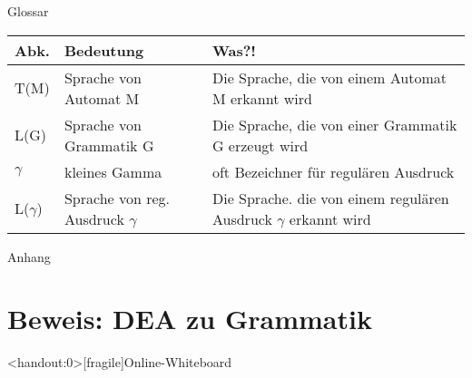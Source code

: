 \begin{frame}[fragile]{Glossar}
  \small
  \begin{tabular}{p{} p{} p{}}
    \toprule
    Abk.        & Bedeutung                          & Was?!                                                               \\
    \midrule
    T(M)        & Sprache von Automat M              & Die Sprache, die von einem Automat M erkannt wird                   \\
    L(G)        & Sprache von Grammatik G            & Die Sprache, die von einer Grammatik G erzeugt wird                 \\
    $\gamma$    & kleines Gamma                      & oft Bezeichner für regulären Ausdruck                               \\
    L($\gamma$) & Sprache von reg. Ausdruck $\gamma$ & Die Sprache. die von einem regulären Ausdruck $\gamma$ erkannt wird \\
    \bottomrule
  \end{tabular}
\end{frame}

\appendix
\begin{frame}[standout]
  Anhang
\end{frame}

\section{Beweis: DEA zu Grammatik}


\begin{frame}<handout:0>[fragile]{Online-Whiteboard}
  \phantom{text}
\end{frame}


